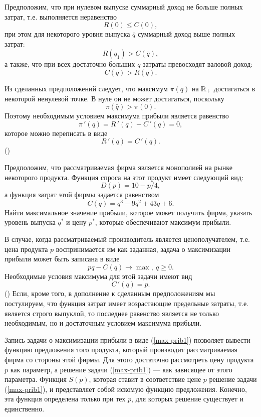     Предположим, что при нулевом выпуске суммарный доход не больше
    полных затрат, т.е. выполняется неравенство
    \[R(0)\leqslant C(0),\]
    при этом для некоторого уровня выпуска $\bar{q}$ суммарный доход выше
    полных затрат:
    \[R(q_{1})>C(\bar{q}),\]
    а также, что при всех достаточно больших $q$ затраты превосходят
    валовой доход:
    \[C(q)>R(q).\]

    Из сделанных предположений следует, что максимум  $\pi(q)$ на $\mathbb{R}_{+}$
    достигаться в некоторой ненулевой точке. В нуле он не может
    достигаться, поскольку
    \[\pi(\bar{q})>\pi(0).\]
    Поэтому необходимым условием максимума прибыли является равенство
    \[ \pi\,'(q)=R\,'(q)-C\,'(q)=0,\]
    которое можно переписать в виде
    \[R\,'(q)=C\,'(q).\]
    ()

\begin{exer}
    Предположим, что рассматриваемая фирма является монополией
    на рынке некоторого продукта. Функция спроса на этот продукт имеет
    следующий вид:
    \[D(p)=10-p/4,\]
    а функция затрат этой фирмы задается равенством
    \[C(q)=q^{3}-9q^{2}+43q+6.\]
    Найти максимальное значение прибыли, которое может получить фирма,
    указать уровень выпуска $q^{*}$ и цену $p^{*}$, которые обеспечивают максимум прибыли.
\end{exer}

    В случае, когда рассматриваемый производитель является ценополучателем,
    т.е. цена продукта $p$ воспринимается им
    как заданная, задача о максимизации прибыли может быть записана
    в виде
\begin{equation}
    \label{max-prib1}
    pq-C(q)\rightarrow\max, \ q\geqslant0.
\end{equation}
    Необходимые условия максимума для этой задачи имеют вид
\begin{equation}
    \label{max-prib1-uslopt}
    C\,'(q)=p.
\end{equation}                 ()
    Если, кроме того, в дополнение к сделанным предположениям мы постулируем,
    что функция затрат имеет возрастающие предельные затраты, т.е.
    является строго выпуклой, то последнее равенство является не только
    необходимым, но и достаточным условием максимума прибыли.

    Запись задачи о максимизации прибыли в виде (\ref{max-prib1})
    позволяет вывести функцию предложения того продукта, который
    производит рассматриваемая фирма со стороны этой фирмы. Для
    этого достаточно рассмотреть цену продукта $p$ как параметр, а
    решение задачи (\ref{max-prib1}) --- как зависящее от этого
    параметра.
    Функция $S(p)$, которая ставит в соответствие цене $p$
    решение задачи (\ref{max-prib1}),
    и представляет собой искомую функцию предложения. Конечно, эта
    функция определена только при тех $p$, для которых решение
    существует и единственно.

